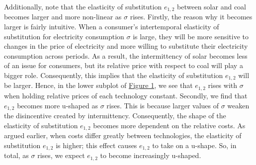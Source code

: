 \documentclass[11pt,a4paper]{extarticle}
\begin{document}

Additionally, note that the elasticity of substitution $e_{1,2}$ between solar and coal becomes larger and more non-linear as $\sigma$ rises. Firstly, the reason why  it becomes larger is fairly intuitive. When a consumer's intertemporal elasticity of substitution for electricity consumption $\sigma$ is large, they will be more sensitive to changes in the price of electricity and more willing to substitute their electricity consumption across periods. As a result, the intermittency of solar becomes less of an  issue for consumers, but its relative price with respect to coal will play a bigger role. Consequently, this implies that the elasticity of substitution $e_{1, 2}$ will be larger. Hence, in the lower subplot of \hyperref[fig:eosnum]{Figure 1}, we see that $e_{1, 2}$ rises with $\sigma$ when holding relative prices of each technology constant. Secondly, we find that $e_{1,2}$ becomes more u-shaped as $\sigma$ rises. This is because larger values of $\sigma$ weaken the disincentive created by intermittency. Consequently, the shape of the elasticity of substitution $e_{1,2}$ becomes more dependent on the relative costs. As argued earlier, when costs differ greatly between technologies, the elasticity of substitution $e_{1,2}$ is higher; this effect causes $e_{1,2}$ to take on a u-shape. So, in total, as $\sigma$ rises, we expect $e_{1,2}$ to become increasingly u-shaped. 
\end{document}
